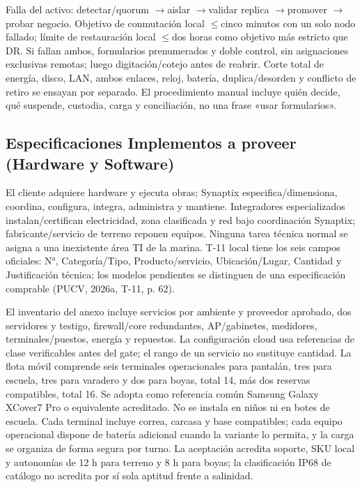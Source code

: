 \documentclass[11pt,letterpaper]{report}
\begin{document}
Falla del activo: detectar/quorum $\rightarrow$aislar $\rightarrow$validar replica $\rightarrow$promover $\rightarrow$probar negocio. Objetivo de conmutación local $\leq$cinco minutos con un solo nodo fallado; límite de restauración local $\leq$dos horas como objetivo más estricto que DR. Si fallan ambos, formularios prenumerados y doble control, sin asignaciones exclusivas remotas; luego digitación/cotejo antes de reabrir. Corte total de energía, disco, LAN, ambos enlaces, reloj, batería, duplica/desorden y conflicto de retiro se ensayan por separado. El procedimiento manual incluye quién decide, qué suspende, custodia, carga y conciliación, no una frase «usar formularios».

\subsection{Especificaciones Implementos a proveer (Hardware y Software)}
El cliente adquiere hardware y ejecuta obras; Synaptix especifica/dimensiona, coordina, configura, integra, administra y mantiene. Integradores especializados instalan/certifican electricidad, zona clasificada y red bajo coordinación Synaptix; fabricante/servicio de terreno reponen equipos. Ninguna tarea técnica normal se asigna a una inexistente área TI de la marina. T-11 local tiene los seis campos oficiales: N°, Categoría/Tipo, Producto/servicio, Ubicación/Lugar, Cantidad y Justificación técnica; los modelos pendientes se distinguen de una especificación comprable (PUCV, 2026a, T-11, p. 62).

El inventario del anexo incluye servicios por ambiente y proveedor aprobado, dos servidores y testigo, firewall/core redundantes, AP/gabinetes, medidores, terminales/puestos, energía y repuestos. La configuración cloud usa referencias de clase verificables antes del gate; el rango de un servicio no sustituye cantidad. La flota móvil comprende seis terminales operacionales para pantalán, tres para escuela, tres para varadero y dos para boyas, total 14, más dos reservas compatibles, total 16. Se adopta como referencia común Samsung Galaxy XCover7 Pro o equivalente acreditado. No se instala en niños ni en botes de escuela. Cada terminal incluye correa, carcasa y base compatibles; cada equipo operacional dispone de batería adicional cuando la variante lo permita, y la carga se organiza de forma segura por turno. La aceptación acredita soporte, SKU local y autonomías de 12 h para terreno y 8 h para boyas; la clasificación IP68 de catálogo no acredita por sí sola aptitud frente a salinidad.
\end{document}
